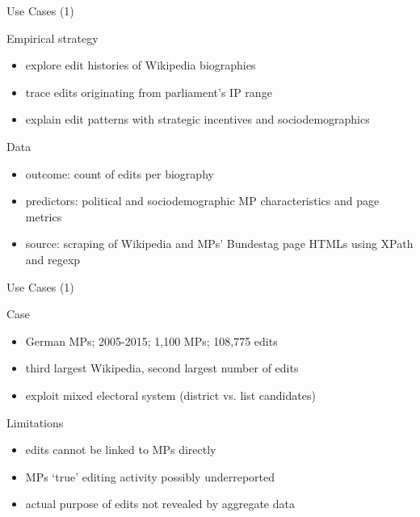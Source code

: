 \begin{frame}{Use Cases (1)}
\begin{block}{Empirical strategy}
\begin{itemize}
	\item explore edit histories of Wikipedia biographies
%
	\item trace edits originating from parliament's IP range
%
	\item explain edit patterns with strategic incentives and sociodemographics
\end{itemize}
\end{block}
\pause
\begin{block}{Data}
\begin{itemize}
	\item outcome: count of edits per biography
%
	\item predictors: political and sociodemographic MP characteristics and page metrics
%
	\item source: scraping of Wikipedia and MPs' Bundestag page HTMLs using XPath and regexp
\end{itemize}
\end{block}
\end{frame}

\begin{frame}{Use Cases (1)}
\begin{block}{Case}
\begin{itemize}
	\item German MPs; 2005-2015; 1,100 MPs; 108,775 edits
% 
	\item third largest Wikipedia, second largest number of edits
% 
	\item exploit mixed electoral system (district vs. list candidates)
% 
\end{itemize}
\end{block}
\pause
\begin{block}{Limitations}
\begin{itemize}
	\item edits cannot be linked to MPs directly
% 
	\item MPs `true' editing activity possibly underreported
% 
	\item actual purpose of edits not revealed by aggregate data
% 
\end{itemize}
\end{block}
\end{frame}

